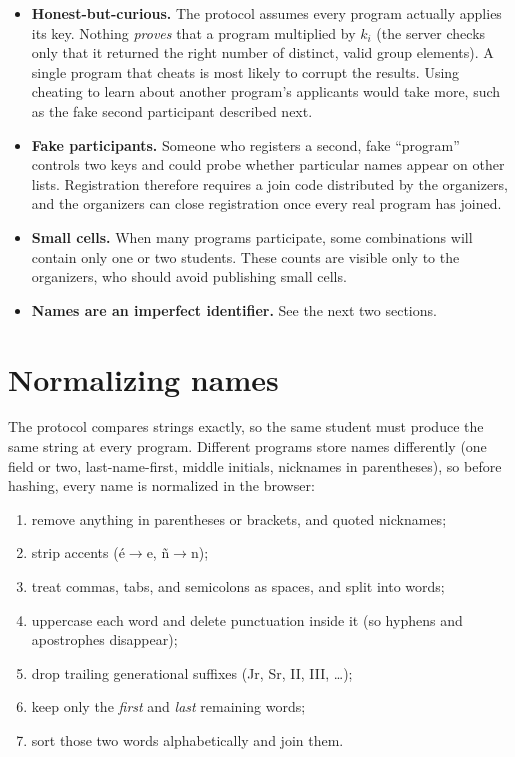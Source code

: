 \documentclass[11pt]{article}
\begin{document}
\begin{itemize}
  \item \textbf{Honest-but-curious.} The protocol assumes every program actually applies its key.
        Nothing \emph{proves} that a program multiplied by $k_i$ (the server checks only that it
        returned the right number of distinct, valid group elements). A single program that cheats
        is most likely to corrupt the results. Using cheating to learn about another program's
        applicants would take more, such as the fake second participant described next.
  \item \textbf{Fake participants.} Someone who registers a second, fake ``program'' controls two
        keys and could probe whether particular names appear on other lists. Registration
        therefore requires a join code distributed by the organizers, and the organizers can close
        registration once every real program has joined.
  \item \textbf{Small cells.} When many programs participate, some combinations will contain only
        one or two students. These counts are visible only to the organizers, who should avoid
        publishing small cells.
  \item \textbf{Names are an imperfect identifier.} See the next two sections.
\end{itemize}

\section{Normalizing names}\label{sec:normalize}

The protocol compares strings exactly, so the same student must produce the same string at every
program. Different programs store names differently (one field or two, last-name-first, middle
initials, nicknames in parentheses), so before hashing, every name is normalized in the browser:

\begin{enumerate}[nosep]
  \item remove anything in parentheses or brackets, and quoted nicknames;
  \item strip accents ({\'e}$\to$e, {\~n}$\to$n);
  \item treat commas, tabs, and semicolons as spaces, and split into words;
  \item uppercase each word and delete punctuation inside it (so hyphens and apostrophes disappear);
  \item drop trailing generational suffixes (Jr, Sr, II, III, \dots);
  \item keep only the \emph{first} and \emph{last} remaining words;
  \item sort those two words alphabetically and join them.
\end{enumerate}
\end{document}
